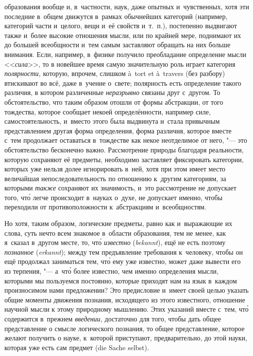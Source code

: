 образования вообще и, в~частности, наук, даже опытных и~чувственных, хотя эти
последние в~общем движутся в~рамках обычнейших категорий (например, категорий
части и~целого, вещи и~её свойств и~т.~п.), постепенно выдвигают также и~более
высокие отношения мысли, или по крайней мере, поднимают их до большей
всеобщности и~тем самым заставляют обращать на них больше внимания. Если,
например, в~физике получило преобладание определение мысли <<{\em сила}>>, то в
новейшее время самую значительную роль играет категория {\em полярности,}
которую, впрочем, слишком à~tort et à~travers (без разбору) втискивают во всё,
даже в~учение о~свете; полярность есть определение такого различия, в
котором различенные {\em неразрывно} связаны друг с~другом. То обстоятельство,
что таким образом отошли от формы абстракции, от того тождества, которое
сообщает некоей определённости, например силе, самостоятельность, и~вместо
этого была выдвинута и~стала привычным представлением другая форма определения,
форма различия, которое вместе с~тем продолжает оставаться в~тождестве как
некое неотделимое от него, "--- это обстоятельство бесконечно важно.
Рассмотрение природы благодаря реальности, которую сохраняют её предметы,
необходимо заставляет фиксировать категории, которых уже нельзя долее
игнорировать в~ней, хотя при этом имеет место величайшая непоследовательность
по отношению к~другим категориям, за которыми {\em также} сохраняют их
значимость, и~это рассмотрение не допускает того, чт\'{о} легче происходит
в~науках о~духе, не допускает именно, чтобы переходили от противоположности
к~абстракциям и~всеобщностям.

Но хотя, таким образом, логические предметы, равно как и~выражающие их слова,
суть нечто всем знакомое в~области образования, тем не менее, как я~сказал
в~другом месте, то,
чт\'{о} {\em известно} ({\em bekannt}), ещё не есть поэтому {\em познанное}
({\em erkannt}); между тем предъявление требования к~человеку, чтобы он ещё
продолжал заниматься тем, чт\'{о} ему уже известно, может даже вывести его из
терпения, "--- а~чт\'{о} более известно, чем именно определения мысли, которыми
мы пользуемся постоянно, которые приходят нам на язык в~каждом произносимом
нами предложении? Это предисловие и~имеет своей целью указать общие моменты
движения познания, исходящего из этого известного, отношение научной мысли к
этому природному мышлению. Этих указаний вместе с~тем, чт\'{о} содержится
в~прежнем {\em введении,} достаточно для того, чтобы дать общее представление о
смысле логического познания, то общее представление, которое желают получить о
науке, к~которой приступают, предварительно, до этой науки, которая уже есть
сам предмет (die Sache selbst).

